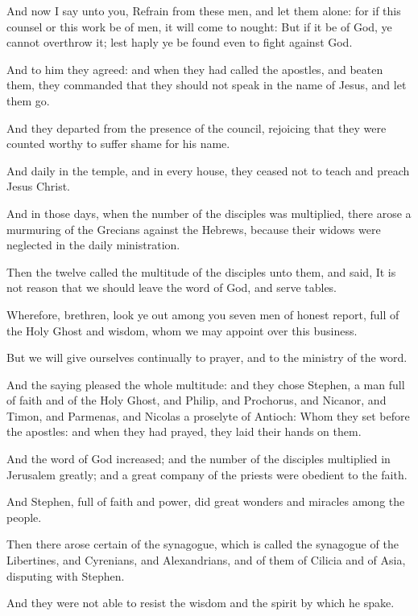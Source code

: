 \Verse And now I say unto you, Refrain from these men, and let them alone: for if this counsel or this work be of men, it will come to nought: \Verse But if it be of God, ye cannot overthrow it; lest haply ye be found even to fight against God.

\Verse And to him they agreed: and when they had called the apostles, and beaten them, they commanded that they should not speak in the name of Jesus, and let them go.

\Verse And they departed from the presence of the council, rejoicing that they were counted worthy to suffer shame for his name.

\Verse And daily in the temple, and in every house, they ceased not to teach and preach Jesus Christ.


\Chapter
\Verse And in those days, when the number of the disciples was multiplied, there arose a murmuring of the Grecians against the Hebrews, because their widows were neglected in the daily ministration.

\Verse Then the twelve called the multitude of the disciples unto them, and said, It is not reason that we should leave the word of God, and serve tables.

\Verse Wherefore, brethren, look ye out among you seven men of honest report, full of the Holy Ghost and wisdom, whom we may appoint over this business.

\Verse But we will give ourselves continually to prayer, and to the ministry of the word.

\Verse And the saying pleased the whole multitude: and they chose Stephen, a man full of faith and of the Holy Ghost, and Philip, and Prochorus, and Nicanor, and Timon, and Parmenas, and Nicolas a proselyte of Antioch: \Verse Whom they set before the apostles: and when they had prayed, they laid their hands on them.

\Verse And the word of God increased; and the number of the disciples multiplied in Jerusalem greatly; and a great company of the priests were obedient to the faith.

\Verse And Stephen, full of faith and power, did great wonders and miracles among the people.

\Verse Then there arose certain of the synagogue, which is called the synagogue of the Libertines, and Cyrenians, and Alexandrians, and of them of Cilicia and of Asia, disputing with Stephen.

\Verse And they were not able to resist the wisdom and the spirit by which he spake.

